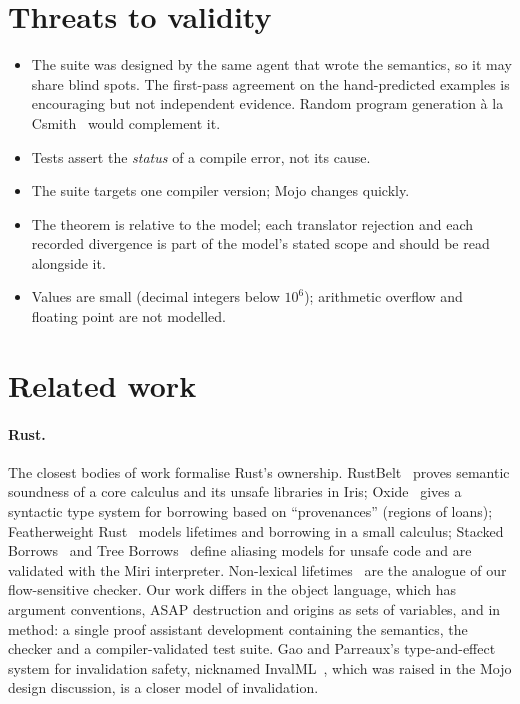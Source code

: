 \documentclass[11pt,a4paper]{article}
\begin{document}
\section{Threats to validity}

\begin{itemize}
\item The suite was designed by the same agent that wrote the semantics, so it
  may share blind spots. The first-pass agreement on the hand-predicted
  examples is encouraging but not independent evidence. Random program
  generation \`a la Csmith~\cite{csmith} would complement it.
\item Tests assert the \emph{status} of a compile error, not its cause.
\item The suite targets one compiler version; Mojo changes quickly.
\item The theorem is relative to the model; each translator rejection and each
  recorded divergence is part of the model's stated scope and should be read
  alongside it.
\item Values are small (decimal integers below $10^6$); arithmetic overflow and
  floating point are not modelled.
\end{itemize}

\section{Related work}\label{sec:related}

\paragraph{Rust.} The closest bodies of work formalise Rust's ownership.
RustBelt~\cite{rustbelt} proves semantic soundness of a core calculus and its
unsafe libraries in Iris; Oxide~\cite{oxide} gives a syntactic type system for
borrowing based on ``provenances'' (regions of loans); Featherweight
Rust~\cite{pearce} models lifetimes and borrowing in a small calculus; Stacked
Borrows~\cite{stackedborrows} and Tree Borrows~\cite{treeborrows} define
aliasing models for unsafe code and are validated with the Miri interpreter.
Non-lexical lifetimes~\cite{rfc2094} are the analogue of our flow-sensitive
checker. Our work differs in the object language, which has argument
conventions, ASAP destruction and origins as sets of variables, and in method: a
single proof assistant development containing the semantics, the checker and a
compiler-validated test suite. Gao and Parreaux's type-and-effect system for invalidation safety, nicknamed InvalML~\cite{invalml}, which was raised in
the Mojo design discussion, is a closer model of invalidation.
\end{document}
